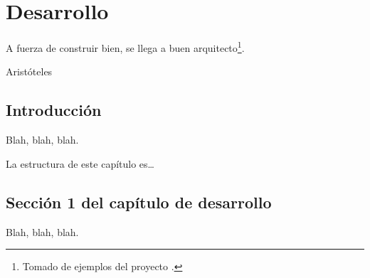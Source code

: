 %
%
%
% 
%
%
%
%

\chapter{Desarrollo}
\label{cha:development}


\begin{FraseCelebre}
  \begin{Frase}
    A fuerza de construir bien, se llega a buen
    arquitecto\footnote{Tomado de ejemplos del proyecto \texis{}.}.
  \end{Frase}
  \begin{Fuente}
    Aristóteles
  \end{Fuente}
\end{FraseCelebre}



\section{Introducción}
\label{sec:development-introduction}

Blah, blah, blah.

La estructura de este capítulo es\ldots


\section{Sección 1 del capítulo de desarrollo}
\label{sec:development-1}

Blah, blah, blah.


